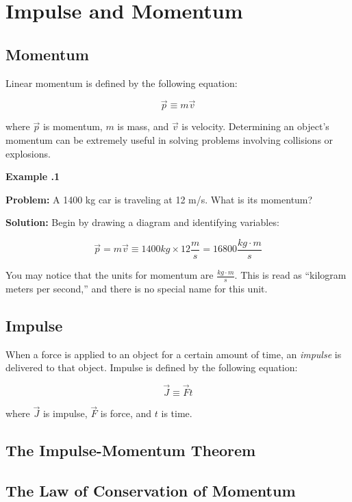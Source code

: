\chapter{Impulse and Momentum}
	\section{Momentum} \label{momentum}  
	Linear momentum is defined by the following equation:
	\begin{mdframed}[backgroundcolor=orange!20!white]
		\begin{equation}
		\vec{p} \equiv m \vec{v} 
		\label{eqn:momentum}
		\end{equation}
	\end{mdframed}
	 where $\vec{p}$ is momentum, $m$ is mass, and $\vec{v} $ is velocity.  Determining an object's momentum can be extremely useful in solving problems involving collisions or explosions.  
	 
	 \begin{mdframed}[backgroundcolor=blue!10!white]
	 	\begin{center}
	 		
	 		
	 		\textbf{Example \thesection.1}	
	 	\end{center}
	 	
	 	\textbf{Problem: } A 1400 kg car is traveling at 12 m/s.  What is its momentum? 
	 	\vspace{0.1in}
	 	
	 	\textbf{Solution:} 
	 	Begin by drawing a diagram and identifying variables:
	 	
	 	
	 	\begin{equation*}
	 	\vec{p} = m \vec{v} \equiv 1400 kg \times 12 \frac{m}{s} = 16800 \frac{kg\cdot m}{s}
	 	\end{equation*}
	 	
	 \end{mdframed}
	 \vspace{0.1in}
	 You may notice that the units for momentum are $\frac{kg \cdot m} {s}$.  This is read as ``kilogram meters per second,'' and there is no special name for this unit.  
	 
	 
	\section{Impulse} \label{impulse} 
		When a force is applied to an object for a certain amount of time, an \textit{impulse} is delivered to that object.  Impulse is defined by the following equation:
	\begin{mdframed}[backgroundcolor=orange!20!white]
		\begin{equation}
		\vec{J} \equiv \vec{F} t 
		\label{eqn:Impulse}
		\end{equation}
	\end{mdframed}
	where $\vec{J}$ is impulse, $\vec{F}$ is force, and $t $ is time. 
	
	
	\section{The Impulse-Momentum Theorem}
	\section{The Law of Conservation of Momentum}
	

		


	


